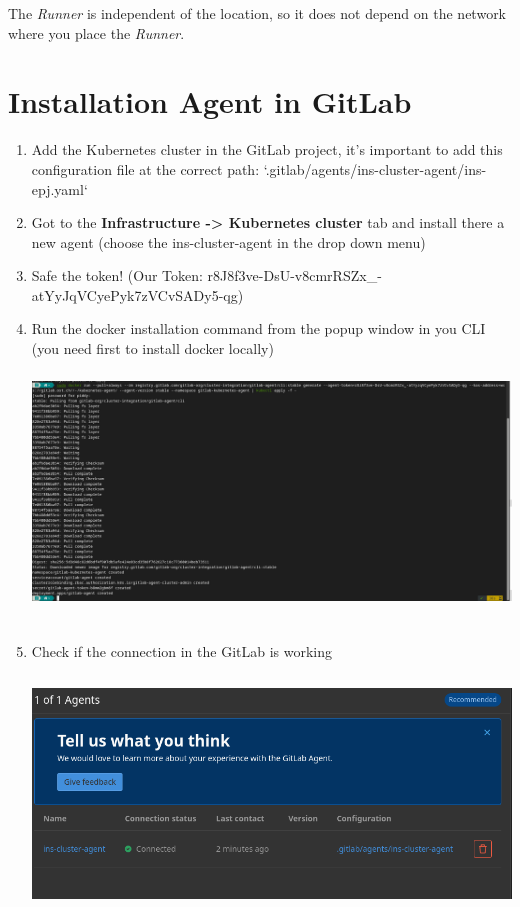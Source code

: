 The \textit{Runner} is independent of the location, so it does not depend on the network where you place the \textit{Runner}.

\section{Installation Agent in GitLab}
\begin{enumerate}
    \item Add the Kubernetes cluster in the GitLab project, it's important to add this configuration file at the correct path: `.gitlab/agents/ins-cluster-agent/ins-epj.yaml`
    \item Got to the \textbf{Infrastructure -> Kubernetes cluster} tab and install there a new agent (choose the ins-cluster-agent in the drop down menu)
    \item Safe the token! (Our Token: r8J8f3ve-DsU-v8cmrRSZx\_-atYyJqVCyePyk7zVCvSADy5-qg)
    \item Run the docker installation command from the popup window in you CLI (you need first to install docker locally) \newline
    \includegraphics[height=7cm]{resources/agent-installation.png}
    \item Check if the connection in the GitLab is working \newline
    \includegraphics[height=7cm]{resources/ins-cluster-agent-connection.png}

\end{enumerate}
